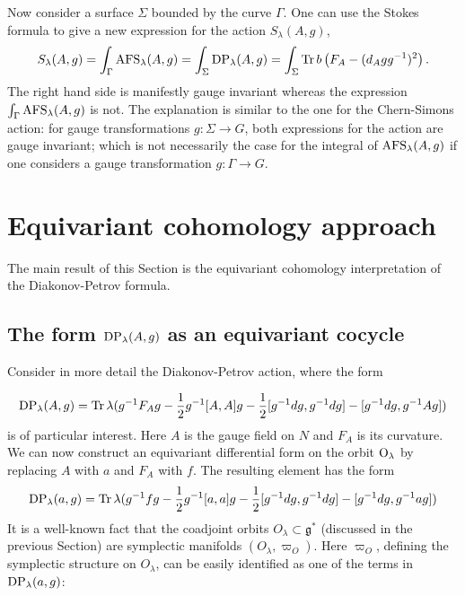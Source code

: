 \documentclass[11pt]{report}
\theoremstyle{plain}
\theoremstyle{definition}
\theoremstyle{remark}
\theoremstyle{remark}
\numberwithin{equation}{section}
\begin{document}
Now consider a surface $\Sigma$ bounded by the curve $\Gamma$. One can use the Stokes formula to give a new expression for the 
action $S_\lambda(A,g)$,
%
$$
S_\lambda(A,g)= \int_\Gamma {\rm AFS}_\lambda(A,g) = \int_\Sigma {\rm DP}_\lambda(A,g) = 
\int_\Sigma {\rm Tr} \, b \left( F_A - (d_A g g^{-1})^2 \right).
$$
The right hand side is manifestly gauge invariant whereas the expression $\int_\Gamma {\rm AFS}_\lambda(A,g)$ is not. The explanation is similar to the one for the Chern-Simons action: for gauge transformations $g: \Sigma \to G$, both expressions for the action are gauge invariant; which is not necessarily the case for the integral of ${\rm AFS}_\lambda(A,g)$ if one considers a gauge transformation $g: \Gamma \to G$. 





\section{Equivariant cohomology approach}

The main result of this Section is the equivariant cohomology interpretation of the Diakonov-Petrov formula.




\subsection{The form ${\rm DP}_\lambda(A,g)$ as an equivariant cocycle}
Consider in more detail the Diakonov-Petrov action, where the form

%
\begin{equation}
{\rm DP}_\lambda(A,g)= {\rm Tr} \, \lambda (g^{-1} F_A g - \frac{1}{2} g^{-1}[A,A] g - \frac{1}{2} [g^{-1} dg , g^{-1} dg] - [g^{-1} dg , g^{-1} Ag])
\end{equation}
is of particular interest. Here $A$ is the gauge field on  $N$ and $F_A$ is its curvature.  We can now construct an equivariant differential form on the orbit ${\rm O}_\lambda$ by replacing $A$ with $a$ and $F_A$ with $f$. The resulting element has the form
%
\begin{equation}
{\rm DP}_\lambda(a,g) = {\rm Tr} \, \lambda (g^{-1} f g - \frac{1}{2} g^{-1}[a,a] g - \frac{1}{2} [g^{-1} dg , g^{-1} dg] - [g^{-1} dg , g^{-1} ag])
\end{equation}
 It is a well-known fact that the coadjoint orbits $O_\lambda \subset \mathfrak{g}^*$ (discussed in the previous Section) are symplectic manifolds $(O_\lambda, \varpi_O)$. Here $\varpi_O$, defining the symplectic structure on $O_\lambda$, can be easily identified as one of the terms in ${\rm DP}_\lambda(a,g)$: 
\end{document}
